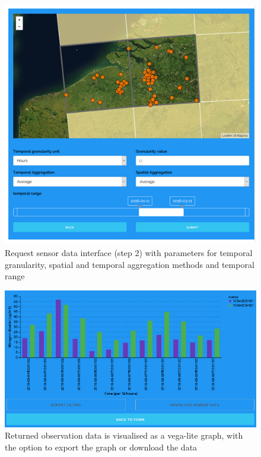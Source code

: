 \begin{figure}
	\centering
	\includegraphics[width=\linewidth]{figs/interface2.PNG}
	\caption{Request sensor data interface (step 2) with parameters for temporal granularity, spatial and temporal aggregation methods and temporal range}
	\label{fig:interface3}
\end{figure}

\begin{figure}
	\centering
	\includegraphics[width=0.9\linewidth]{figs/interface4.PNG}
	\caption{Returned observation data is visualised as a vega-lite graph, with the option to export the graph or download the data}
	\label{fig:interface4}
\end{figure}  
